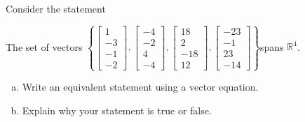 
\begin{exerciseStatement}


Consider the statement 
\begin{center}\begin{minipage}{0.8\textwidth}
 The set of vectors \( \left\{ \left[\begin{array}{c}
1 \\
-3 \\
-1 \\
-2
\end{array}\right] , \left[\begin{array}{c}
-4 \\
-2 \\
4 \\
-4
\end{array}\right] , \left[\begin{array}{c}
18 \\
2 \\
-18 \\
12
\end{array}\right] , \left[\begin{array}{c}
-23 \\
-1 \\
23 \\
-14
\end{array}\right] \right\} \)spans \(\mathbb{R}^4\). 
\end{minipage}\end{center}
    


\begin{enumerate}[(a)]
\item  Write an equivalent statement using a vector equation.
\item  Explain why your statement is true or false.
\end{enumerate}
    
\end{exerciseStatement}
    
